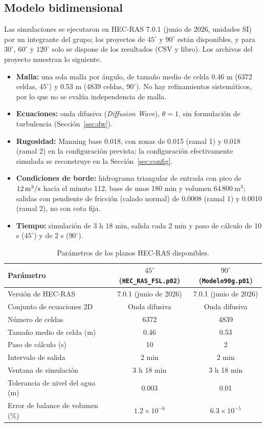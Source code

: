 \subsection{Modelo bidimensional}\label{sec:hecras}
Las simulaciones se ejecutaron en HEC-RAS 7.0.1 (junio de 2026, unidades SI) por un integrante del grupo; los proyectos de $45^\circ$ y $90^\circ$ están disponibles, y para $30^\circ$, $60^\circ$ y $120^\circ$ solo se dispone de los resultados (CSV y libro). Los archivos del proyecto muestran lo siguiente.
\begin{itemize}
\item \textbf{Malla:} una sola malla por ángulo, de tamaño medio de celda 0.46 m (6372 celdas, $45^\circ$) y 0.53 m (4839 celdas, $90^\circ$). No hay refinamientos sistemáticos, por lo que no se evalúa independencia de malla.
\item \textbf{Ecuaciones:} onda difusiva (\textit{Diffusion Wave}), $\theta=1$, sin formulación de turbulencia (Sección~\ref{sec:dw}).
\item \textbf{Rugosidad:} Manning base 0.018, con zonas de 0.015 (ramal 1) y 0.018 (ramal 2) en la configuración prevista; la configuración efectivamente simulada se reconstruye en la Sección~\ref{sec:config}.
\item \textbf{Condiciones de borde:} hidrograma triangular de entrada con pico de $12\,\mathrm{m^3/s}$ hacia el minuto 112, base de unos 180 min y volumen $64\,800\ \mathrm{m^3}$; salidas con pendiente de fricción (calado normal) de 0.0008 (ramal 1) y 0.0010 (ramal 2), no con cota fija.
\item \textbf{Tiempo:} simulación de 3 h 18 min, salida cada 2 min y paso de cálculo de 10 s ($45^\circ$) y de 2 s ($90^\circ$).
\end{itemize}
\begin{table}[H]
\centering\small
\caption{Parámetros de los planos HEC-RAS disponibles.}\label{tab:planes}
\begin{tabular}{lcc}
\toprule
Parámetro & $45^\circ$ (\texttt{HEC\_RAS\_FSL.p02}) & $90^\circ$ (\texttt{Modelo90g.p01})\\\midrule
Versión de HEC-RAS & 7.0.1 (junio de 2026) & 7.0.1 (junio de 2026)\\
Conjunto de ecuaciones 2D & Onda difusiva & Onda difusiva\\
Número de celdas & 6372 & 4839\\
Tamaño medio de celda (m) & 0.46 & 0.53\\
Paso de cálculo (s) & 10 & 2\\
Intervalo de salida & 2 min & 2 min\\
Ventana de simulación & 3 h 18 min & 3 h 18 min\\
Tolerancia de nivel del agua (m) & 0.003 & 0.01\\
Error de balance de volumen (\%) & $1.2\times10^{-6}$ & $6.3\times10^{-5}$\\\bottomrule
\end{tabular}
\end{table}

